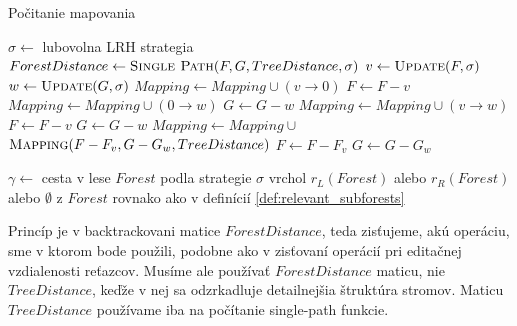 \begin{algorithm}
  \caption{Počitanie mapovania}
  \label{alg:ted:mapping}
  \begin{algorithmic}[1]
      \State $\sigma \gets$ lubovolna LRH strategia
      \State $ForestDistance \gets \Call{Single Path}{F, G, TreeDistance, \sigma}$
        \State $v \gets \Call{Update}{F, \sigma}$
        \State $w \gets \Call{Update}{G, \sigma}$
          \State $Mapping \gets Mapping \cup (v \rightarrow 0)$
          \State $F \gets F - v$
          \State $Mapping \gets Mapping \cup (0 \rightarrow w)$
          \State $G \gets G - w$
        \Else
            \State $Mapping \gets Mapping \cup (v \rightarrow w)$
            \State $F \gets F - v$
            \State $G \gets G - w$
          \Else
            \State $Mapping \gets Mapping \cup$
            \Indent
              \State $\Call{Mapping}{F - F_{v}, G - G_{w}, TreeDistance}$
            \EndIndent
            \State $F \gets F - F_{v}$
            \State $G \gets G - G_{w}$
          \EndIf
        \EndIf
      \EndWhile
    \EndProcedure
  \item[]
      \State $\gamma \gets$ cesta v lese $Forest$ podla strategie $\sigma$
      \State \Return vrchol $r_{L}(Forest)$ alebo $r_{R}(Forest)$ alebo
        $\emptyset$ z $Forest$
        \Indent
          \State rovnako ako v definícií \ref{def:relevant_subforests}
        \EndIndent
      \label{alg:ted:mapping:update}
    \EndProcedure
  \end{algorithmic}
\end{algorithm}

Princíp je v backtrackovani matice $ForestDistance$, teda zisťujeme, akú operáciu, sme v ktorom
bode použili, podobne ako v zisťovaní operácií pri editačnej vzdialenosti reťazcov.
Musíme ale používať $ForestDistance$ maticu, nie $TreeDistance$, keďže v nej
sa odzrkadluje detailnejšia štruktúra stromov. Maticu $TreeDistance$ používame iba na
počítanie single-path funkcie.



